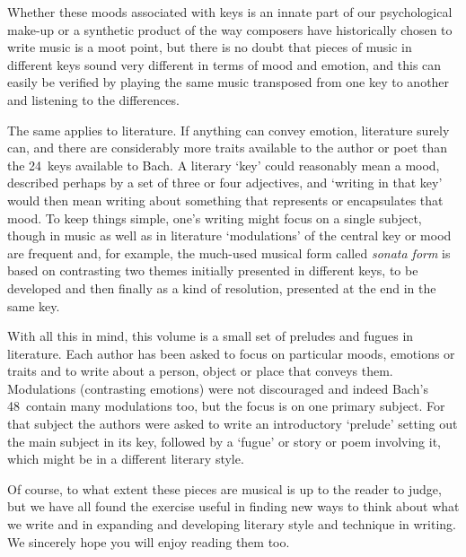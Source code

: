Whether these moods associated with keys is an innate part of our
psychological make-up or a synthetic product of the way composers
have historically chosen to write
music is a moot point, but there is no doubt that pieces of
music in different keys sound very different in terms of mood and
emotion, and this can easily be verified by playing the same music
transposed from one key to another and listening to the differences.

The same applies to literature.  If anything can convey emotion,
literature surely can, and there are considerably more traits
available to the author or poet than the 24~keys available to Bach.  A
literary `key' could reasonably mean a mood, described perhaps by a
set of three or four adjectives, and `writing in that key' would then
mean writing about something that represents or encapsulates that
mood.  To keep things simple, one's writing might focus on a single
subject, though in music as well as in literature `modulations' of the
central key or mood are frequent and, for example, the much-used
musical form called \textit{sonata form} is based on contrasting two
themes initially presented in different keys, to be developed and then
finally as a kind of resolution, presented at the end in the same key.

With all this in mind, this volume is a small set of preludes and
fugues in literature. Each author has been asked to focus on
particular moods, emotions or traits and to write about a person,
object or place that conveys them.  Modulations (contrasting emotions)
were not discouraged and indeed Bach's 48~contain many modulations
too, but the focus is on one primary subject.  For that subject the
authors were asked to write an introductory `prelude' setting out the
main subject in its key, followed by a `fugue' or story or poem
involving it, which might be in a different literary style.

Of course, to what extent these pieces are musical is up to the reader
to judge, but we have all found the exercise useful in finding new
ways to think about what we write and in expanding and developing
literary style and technique in writing. We sincerely hope you will
enjoy reading them too.

